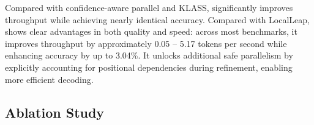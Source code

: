 Compared with confidence-aware parallel and KLASS, \dawn{} significantly improves throughput while achieving nearly identical accuracy. Compared with LocalLeap, \dawn{} shows clear advantages in both quality and speed: across most benchmarks, it improves throughput by approximately 0.05 – 5.17 tokens per second while enhancing accuracy by up to 3.04\%. It unlocks additional safe parallelism by explicitly accounting for positional dependencies during refinement, enabling more efficient decoding. 

\subsection{Ablation Study}


